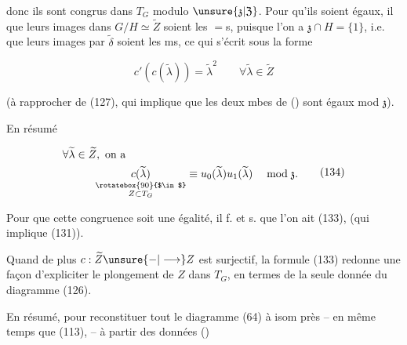 

donc ils sont congrus dans $T_G$ modulo $\unsure{\mathfrak{z}|\mathfrak{Z}}$. Pour  qu'ils soient égaux, il   que leurs images dans $G/H\simeq\widetilde Z$ soient les $=$s, puisque l'on a $\mathfrak{z}\cap H=\{1\}$, i.e. que leurs images par $\widetilde\delta$ soient les ms, ce qui s'écrit sous la forme

\[c'(c(\widetilde\lambda))=\widetilde\lambda^2\qquad\forall\widetilde\lambda\in\widetilde Z\tag*{(133)}\]

(à rapprocher de (127), qui implique que les deux mbes de () sont égaux mod $\mathfrak{z}$).

En résumé

\[\begin{aligned}
&\forall\widetilde\lambda\in\widetilde Z,\ \text{on a}\\
&\hspace{3em}\underset{\substack{\rotatebox{90}{$\in$}\\Z\subset T_G}}{c(\widetilde\lambda)}
\equiv u_0(\widetilde\lambda)u_1(\widetilde\lambda)\quad\bmod\mathfrak{z}.
\end{aligned}\tag*{(134)}\]

Pour que cette congruence soit une égalité, il f. et s. que l'on ait (133), (qui implique (131)).

Quand de plus  $c:\widetilde Z\unsure{-|\longrightarrow}Z$ est surjectif, la formule (133) redonne une façon d'expliciter le plongement de $Z$ dans $T_G$, en termes de la seule donnée du diagramme (126).

En résumé, pour reconstituer tout le diagramme (64) à isom près -- en même temps que (113), -- à partir des données ()

